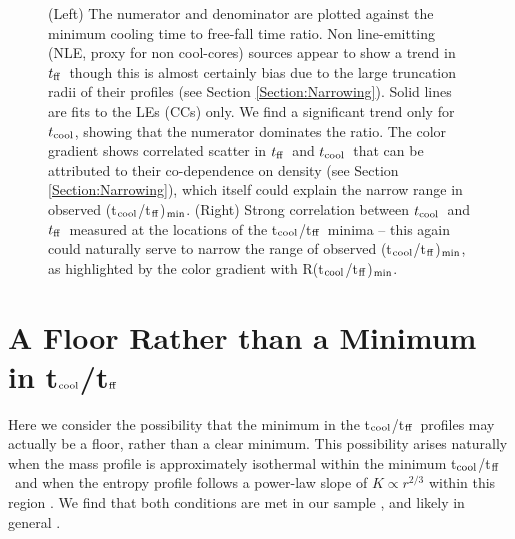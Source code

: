\documentclass[twocolumn]{aastex6}
\newcommand{\tctff}{{t$_{\rm cool}$/t$_{\rm ff}$}}
\newcommand{\tctffmin}{(\tctff)$_{\rm min}$}
\newcommand{\Rtctffmin}{R(\tctff)$_{\rm min}$}
\newcommand{\tc}{$t_{\rm cool}$}
\newcommand{\tff}{$t_{\rm ff}$}
\begin{document}
\begin{figure*}    
  \centering
  \caption{(Left) The numerator and denominator are plotted against the minimum cooling time to free-fall time ratio.  Non line-emitting (NLE, proxy for non cool-cores) sources appear to show a trend in \tff\ though this is almost certainly bias due to the large truncation radii of their profiles (see Section \ref{Section:Narrowing}).  Solid lines are fits to the LEs (CCs) only.  We find a significant trend only for \tc, showing that the numerator dominates the ratio.  The color gradient shows correlated scatter in \tff\ and \tc\ that can be attributed to their co-dependence on density (see Section \ref{Section:Narrowing}), which itself could explain the narrow range in observed \tctffmin.  (Right) Strong correlation between \tc\ and \tff\ measured at the locations of the \tctff\ minima -- this again could naturally serve to narrow the range of observed \tctffmin, as highlighted by the color gradient with \Rtctffmin.}
 \label{Figure:Timescale_Comparison}
\end{figure*}



\section{A Floor Rather than a Minimum in \tctff} \label{Section:tctff_floor}

Here we consider the possibility that the minimum in the \tctff\ profiles may actually be a floor, rather than a clear minimum.  This possibility arises naturally when the mass profile is approximately isothermal within the minimum \tctff\ and when the entropy profile follows a power-law slope of $ K \propto r^{2/3}$ within this region \cite[see Section \ref{Section:EntropyProfiles}, also][]{Panagoulia14a}. We find that both conditions are met in our sample \cite[][and Figure \ref{EntropyProfiles} here]{Panagoulia14a,Hogan17}, and likely in general \cite[e.g.][]{Koopmans09}. 
\end{document}
